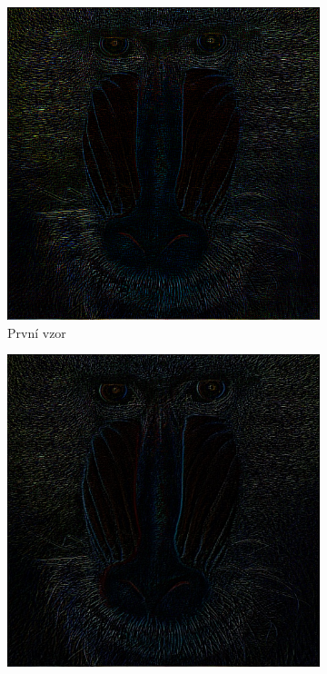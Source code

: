 \documentclass[a4paper,11pt]{scrartcl}
\begin{document}
\begin{figure}[!ht]
    \centering
    \caption{Porovnání výsledků}
    \label{porovnani}
    \begin{subfigure}[b]{0.4\textwidth}
        \includegraphics[width=\textwidth]{img/example1_E.png}
        \caption{První vzor}
        \label{fig:gull}
    \end{subfigure}
    \begin{subfigure}[b]{0.4\textwidth}
        \includegraphics[width=\textwidth]{img/ranksel-simple-ssim-dynamic_example1.jpg}

\end{subfigure}
\end{figure}
\end{document}
